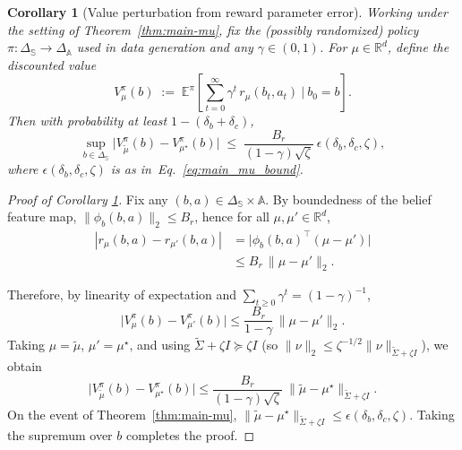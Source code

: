 \documentclass[10pt]{article} %
\theoremstyle{plain}
\newtheorem{corollary}[theorem]{Corollary}
\theoremstyle{definition}
\theoremstyle{remark}
\newcommand{\bA}{\mathbb{A}}
\newcommand{\bE}{\mathbb{E}}
\newcommand{\bR}{\mathbb{R}}
\newcommand{\bS}{\mathbb{S}}
\begin{document}
\begin{corollary}[Value perturbation from reward parameter error]\label{cor:value-perturb}
Working under the setting of Theorem~\ref{thm:main-mu}, fix the (possibly randomized) policy
\(\pi:\Delta_{\bS}\to\Delta_{\bA}\) used in data generation and any \(\gamma\in(0,1)\).
For \(\mu\in\bR^d\), define the discounted value
\[
V_\mu^\pi(b)\;:=\;\bE^\pi\!\left[\sum_{t=0}^\infty \gamma^t\,r_\mu(b_t,a_t)\ \bigg|\ b_0=b\right].
\]
Then with probability at least \(1-(\delta_b+\delta_c)\),
\[
\sup_{b\in\Delta_{\bS}} \big|V_{\tilde\mu}^\pi(b)-V_{\mu^\star}^\pi(b)\big|
\;\le\;
\frac{B_r}{(1-\gamma)\sqrt{\zeta}}\ \epsilon(\delta_b,\delta_c,\zeta),
\]
where \(\epsilon(\delta_b,\delta_c,\zeta)\) is as in~Eq.~\ref{eq:main_mu_bound}.
\end{corollary}



\begin{proof}[Proof of Corollary \ref{cor:value-perturb}]\label{proof:corollary-value}
Fix any \((b,a)\in\Delta_{\bS}\times\bA\). By boundedness of the belief feature map,
\(\|\phi_b(b,a)\|_2\le B_r\), hence for all \(\mu,\mu'\in\bR^d\),
\begin{align*}
|r_\mu(b,a)-r_{\mu'}(b,a)|
&=\big|\phi_b(b,a)^\top(\mu-\mu')\big|\\
&\le B_r\,\|\mu-\mu'\|_2.
\end{align*}

Therefore, by linearity of expectation and \(\sum_{t\ge0}\gamma^t=(1-\gamma)^{-1}\),
\[
\big|V_\mu^\pi(b)-V_{\mu'}^\pi(b)\big|
\le \frac{B_r}{1-\gamma}\,\|\mu-\mu'\|_2.
\]
Taking \(\mu=\tilde\mu\), \(\mu'=\mu^\star\), and using \(\tilde\Sigma+\zeta I\succeq \zeta I\) (so
\(\|\nu\|_2\le \zeta^{-1/2}\|\nu\|_{\tilde\Sigma+\zeta I}\)),
we obtain
\[
\big|V_{\tilde\mu}^\pi(b)-V_{\mu^\star}^\pi(b)\big|
\le \frac{B_r}{(1-\gamma)\sqrt{\zeta}}\ \|\tilde\mu-\mu^\star\|_{\tilde\Sigma+\zeta I}.
\]
On the event of Theorem~\ref{thm:main-mu}, \(\|\tilde\mu-\mu^\star\|_{\tilde\Sigma+\zeta I}\le \epsilon(\delta_b,\delta_c,\zeta)\).
Taking the supremum over \(b\) completes the proof.

\end{proof}


\end{document}
